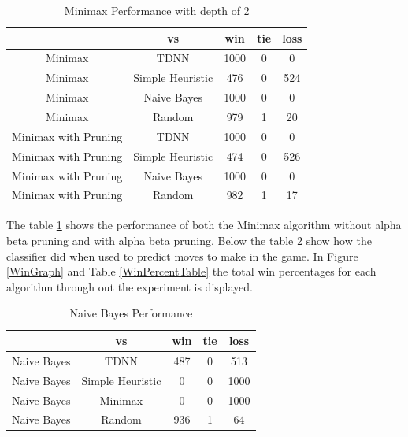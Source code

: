 \documentclass[12pt,letterpaper]{article}
\begin{document}
\begin{table}[h]
\begin{center}
\begin{tabular}{|c||c|c|c|c|}
\hline
& vs & win & tie & loss\\
\hline \hline
Minimax & TDNN & 1000 & 0 & 0\\
\hline 
Minimax & Simple Heuristic & 476 & 0 & 524\\
\hline 
Minimax & Naive Bayes & 1000 & 0 & 0\\
\hline 
Minimax & Random & 979 & 1 & 20\\
\hline 
Minimax with Pruning & TDNN & 1000 & 0 & 0\\
\hline 
Minimax with Pruning & Simple Heuristic & 474 & 0 & 526\\
\hline 
Minimax with Pruning & Naive Bayes & 1000 & 0 & 0\\
\hline 
Minimax with Pruning & Random & 982 & 1 & 17\\
\hline 
\end{tabular}
\end{center}
\caption{Minimax Performance with depth of 2}
\label{MinimaxTable}
\end{table}

The table \ref{MinimaxTable} shows the performance of both the Minimax algorithm without alpha beta pruning and with alpha beta pruning. Below the table \ref{NaiveBayesTable} show how the classifier did when used to predict moves to make in the game. In Figure \ref{WinGraph} and Table \ref{WinPercentTable} the total win percentages for each algorithm through out the experiment is displayed.


\begin{table}[h]
\begin{center}
\begin{tabular}{|c||c|c|c|c|}
\hline
& vs & win & tie & loss\\
\hline \hline
Naive Bayes & TDNN & 487 & 0 & 513\\
\hline 
Naive Bayes & Simple Heuristic & 0 & 0 & 1000\\
\hline 
Naive Bayes & Minimax & 0 & 0 & 1000\\
\hline 
Naive Bayes & Random & 936 & 1 & 64\\
\hline 
\end{tabular}
\end{center}
\caption{Naive Bayes Performance}
\label{NaiveBayesTable}
\end{table}
\end{document}
